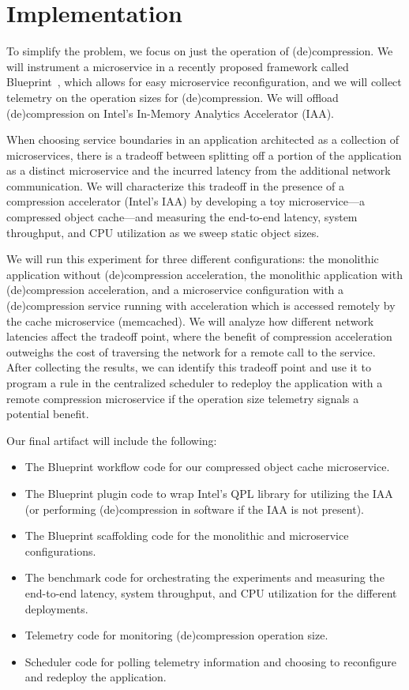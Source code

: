 \section{Implementation}
To simplify the problem, we focus on just the operation of (de)compression.
We will instrument a microservice in a recently proposed framework called Blueprint~\cite{anand2023blueprint}, which allows for easy microservice reconfiguration, and we will collect telemetry on the operation sizes for (de)compression.
We will offload (de)compression on Intel's In-Memory Analytics Accelerator (IAA).

When choosing service boundaries in an application architected as a collection of microservices, there is a tradeoff between splitting off a portion of the application as a distinct microservice and the incurred latency from the additional network communication.
We will characterize this tradeoff in the presence of a compression accelerator (Intel's IAA) by developing a toy microservice---a compressed object cache---and measuring the end-to-end latency, system throughput, and CPU utilization as we sweep static object sizes.

We will run this experiment for three different configurations: the monolithic application without (de)compression acceleration, the monolithic application with (de)compression acceleration, and a microservice configuration with a (de)compression service running with acceleration which is accessed remotely by the cache microservice (memcached).
We will analyze how different network latencies affect the tradeoff point, where the benefit of compression acceleration outweighs the cost of traversing the network for a remote call to the service.
After collecting the results, we can identify this tradeoff point and use it to program a rule in the centralized scheduler to redeploy the application with a remote compression microservice if the operation size telemetry signals a potential benefit.

Our final artifact will include the following:
\begin{itemize}
    \item The Blueprint workflow code for our compressed object cache microservice.
    \item The Blueprint plugin code to wrap Intel's QPL library for utilizing the IAA (or performing (de)compression in software if the IAA is not present).
    \item The Blueprint scaffolding code for the monolithic and microservice configurations.
    \item The benchmark code for orchestrating the experiments and measuring the end-to-end latency, system throughput, and CPU utilization for the different deployments.
    \item Telemetry code for monitoring (de)compression operation size.
    \item Scheduler code for polling telemetry information and choosing to reconfigure and redeploy the application.
\end{itemize}


